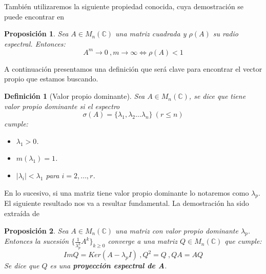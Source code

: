 \documentclass[size=a4, parskip=half, titlepage=false, toc=flat, toc=bib, 12pt]{scrartcl}
\theoremstyle{theorem-style}
\newtheorem{nprop}{Proposición}[section]
\theoremstyle{definition-style}
\newtheorem{ndef}{Definición}[section]
\theoremstyle{remark-style}
\theoremstyle{example-style}
\theoremstyle{definition-style}
\theoremstyle{remark-style}
\begin{document}
También utilizaremos la siguiente propiedad conocida, cuya demostración se puede encontrar en \cite{modelos}

\begin{nprop}
\label{res1}
Sea $A \in M_n(\mathbb{C})$ una matriz cuadrada y $\rho(A)$ su radio espectral. Entonces:
$$A^m \rightarrow 0 \ ,  m \rightarrow \infty \Leftrightarrow \rho(A) < 1 $$
\end{nprop}


A continuación presentamos una definición que será clave para encontrar el vector propio que estamos buscando.

\begin{ndef}[Valor propio dominante]
Sea $A \in M_n(\mathbb{C})$, se dice que tiene valor propio dominante si el espectro
$$\sigma (A) = \{ \lambda_1, \lambda_2 \dots \lambda_n \} \   (r \leq n)$$
cumple:
\begin{itemize}
\item $\lambda_1 > 0$.
\item $m(\lambda_1) = 1$.
\item $|\lambda_i| < \lambda_1$ para $i = 2, \dots , r$.
\end{itemize}
\end{ndef}
En lo sucesivo, si una matriz tiene valor propio dominante lo notaremos como $\lambda_p$. El siguiente resultado nos va a resultar fundamental. La demostración ha sido extraída de \cite{modelos}

\begin{nprop} Sea $A \in M_n(\mathbb{C})$ una matriz con valor propio dominante $\lambda_p$. Entonces la sucesión $\{\frac{1}{ \lambda_p^k } A^k \}_{k\geq 0}$ converge a una matriz $Q \in M_n(\mathbb{C})$ que cumple:
$$ImQ = Ker ( A - \lambda_p I) \ , Q^2 = Q \ , QA = AQ $$
Se dice que $Q$ es una \textbf{proyección espectral de A}.
\label{converge}
\end{nprop}
\end{document}

